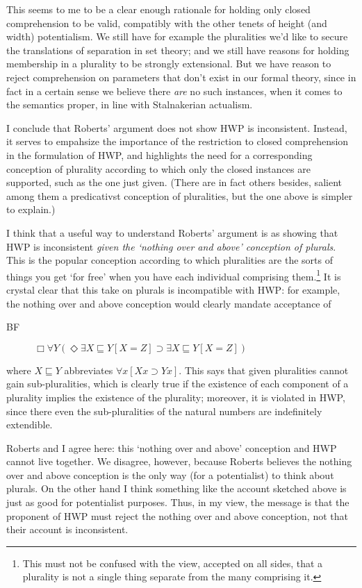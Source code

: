 \documentclass{article}
\begin{document}
This seems to me to be a clear enough rationale for holding only closed comprehension 
to be valid, compatibly with the other tenets of height (and width) potentialism.
We still have for example the pluralities we'd like to secure the translations 
of separation in set theory; and we still have reasons for holding membership in 
a plurality to be strongly extensional. But we have reason to reject 
comprehension on parameters that don't exist in our formal theory, since 
in fact in a certain sense 
we believe there \emph{are} no such instances, when it comes to the semantics proper,
in line with Stalnakerian actualism.

I conclude that Roberts' argument does not show HWP is inconsistent.
Instead, it serves to empahsize the importance of the 
restriction to closed comprehension
in the formulation of HWP, 
and highlights the need for a corresponding conception of 
plurality according to which 
only the closed instances are supported, such as the one just given. 
(There are in fact others besides, salient among them a predicativst 
conception of pluralities, but the one above is simpler to explain.)

I think that a useful way to understand Roberts' argument is as showing
that HWP is inconsistent \emph{given the 
`nothing over and above' conception of plurals}. This is the popular conception 
according to which pluralities are the sorts of things you get `for free'
when you have each individual comprising them.\footnote{This must not be confused with 
the view, accepted on all sides, that a plurality is not a single thing 
separate from the many comprising it.} It is crystal 
clear that this take on plurals is incompatible with HWP: for example, 
the nothing over and above conception would clearly mandate acceptance of 
\begin{description}
    \item[BF] $\Box \forall Y (\Diamond \exists X \sqsubseteq Y [X = Z] \supset \exists X \sqsubseteq Y[X = Z])$
\end{description}
where $X \sqsubseteq Y$ abbreviates $\forall x[Xx \supset Yx]$. 
This says that given pluralities cannot gain sub-pluralities, which 
is clearly true if the existence of each component of a plurality 
implies the existence of the plurality; moreover, it is violated 
in HWP, since there even the sub-pluralities of the natural numbers are indefinitely 
extendible.

Roberts and I agree here:
this `nothing over and above' conception and HWP cannot live together.
We disagree, however, because Roberts believes the nothing over and above 
conception is the only way (for a potentialist) to think about plurals.
On the other hand I think something like the account sketched above is 
just as good for potentialist purposes. Thus, in my view, 
the message is that the proponent of HWP must reject the nothing over and 
above conception, not that their account is inconsistent.
\end{document}
